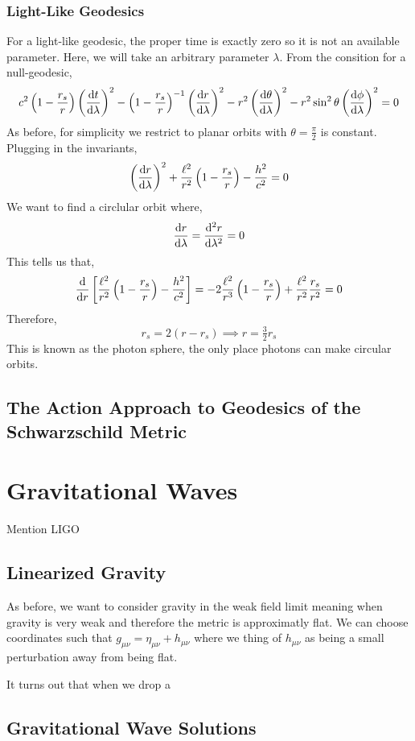 \documentclass[11pt, a4paper]{article}
\begin{document}
\subsubsection{Light-Like Geodesics}

For a light-like geodesic, the proper time is exactly zero so it is not an available parameter. Here, we will take an arbitrary parameter $\lambda$. From the consition for a null-geodesic,
\[ c^2 \left(1 - \frac{r_s}{r} \right) \left( \frac{\mathrm{d}t}{\mathrm{d}\lambda} \right)^2 - \left(1 - \frac{r_s}{r} \right)^{-1} \left( \frac{\mathrm{d}r}{\mathrm{d}\lambda} \right)^2 - r^2 \left( \frac{\mathrm{d}\theta}{\mathrm{d}\lambda} \right)^2 - r^2 \sin^2{\theta} \left( \frac{\mathrm{d}\phi}{\mathrm{d}\lambda} \right)^2 = 0 \]
As before, for simplicity we restrict to planar orbits with $\theta = \frac{\pi}{2}$ is constant. Plugging in the invariants,
\[ \left( \frac{\mathrm{d}r}{\mathrm{d}\lambda} \right)^2 + \frac{\ell^2}{r^2} \left(1 - \frac{r_s}{r} \right) - \frac{h^2}{c^2}  = 0 \]
We want to find a circlular orbit where,
\[ \frac{\mathrm{d}r}{\mathrm{d}\lambda} = \frac{\mathrm{d}^{2} r}{\mathrm{d}\lambda^{2}} = 0 \]
This tells us that,
\[ \frac{\mathrm{d}}{\mathrm{d}r} \left[ \frac{\ell^2}{r^2} \left(1 - \frac{r_s}{r} \right) - \frac{h^2}{c^2} \right] = - 2 \frac{\ell^2}{r^3} \left(1 - \frac{r_s}{r} \right) + \frac{\ell^2}{r^2} \frac{r_s}{r^2} = 0 \]
Therefore,
\[ r_s = 2 (r - r_s) \implies r = \tfrac{3}{2} r_s  \]
This is known as the photon sphere, the only place photons can make circular orbits.
 
\subsection{The Action Approach to Geodesics of the Schwarzschild Metric}

\section{Gravitational Waves}
Mention LIGO

\subsection{Linearized Gravity}

As before, we want to consider gravity in the weak field limit meaning when gravity is very weak and therefore the metric is approximatly flat. We can choose coordinates such that $g_{\mu \nu} = \eta_{\mu \nu} + h_{\mu \nu}$ where we thing of $h_{\mu \nu}$ as being a small perturbation away from being flat. 

It turns out that when we drop a

\subsection{Gravitational Wave Solutions}
\end{document}
